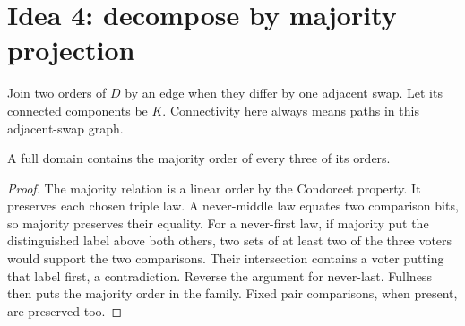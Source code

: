 \section{Idea 4: decompose by majority projection}\label{sec:components}
Join two orders of \(D\) by an edge when they differ by one adjacent
swap. Let its connected components be \(K\). Connectivity here always
means paths in this adjacent-swap graph.

\begin{lemma}\label{lem:median}
A full domain contains the majority order of every three of its orders.
\end{lemma}
\begin{proof}
The majority relation is a linear order by the Condorcet property.
It preserves each chosen triple law. A never-middle law equates two
comparison bits, so majority preserves their equality. For a never-first
law, if majority put the distinguished label above both others, two
sets of at least two of the three voters would support the two
comparisons. Their intersection contains a voter putting that label
first, a contradiction. Reverse the argument for never-last. Fullness
then puts the majority order in the family. Fixed pair comparisons,
when present, are preserved too.
\end{proof}

